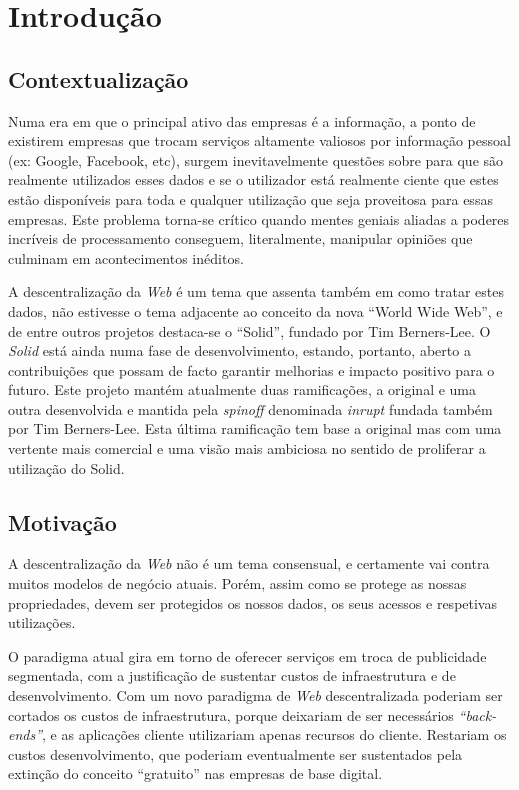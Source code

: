 \chapter{Introdução}
\label{cap:1}

\section{Contextualização}
Numa era em que o principal ativo das empresas é a informação, a ponto de existirem empresas que trocam serviços altamente valiosos por informação pessoal (ex: Google, Facebook, etc)\cite{top_three_issues_centralized_web}, surgem inevitavelmente questões sobre para que são realmente utilizados esses dados e se o utilizador está realmente ciente que estes estão disponíveis para toda e qualquer utilização que seja proveitosa para essas empresas\cite{facebook_data_hell_medium}. Este problema torna-se crítico quando mentes geniais aliadas a poderes incríveis de processamento conseguem, literalmente, manipular opiniões que culminam em acontecimentos inéditos\cite{cambridge_analytica}.

A descentralização da \emph{Web} é um tema que assenta também em como tratar estes dados, não estivesse o tema adjacente ao conceito da nova “World Wide Web”, e de entre outros projetos destaca-se o “Solid”, fundado por Tim Berners-Lee. O \emph{Solid} está ainda numa fase de desenvolvimento, estando, portanto, aberto a contribuições que possam de facto garantir melhorias e impacto positivo para o futuro\cite{why_web_decentralization_future}. Este projeto mantém atualmente duas ramificações, a original e uma outra desenvolvida e mantida pela \emph{spinoff} denominada \emph{inrupt} fundada também por Tim Berners-Lee. Esta última ramificação tem base a original mas com uma vertente mais comercial e uma visão mais ambiciosa no sentido de proliferar a utilização do Solid.

\section{Motivação}
A descentralização da \emph{Web} não é um tema consensual, e certamente vai contra muitos modelos de negócio atuais. Porém, assim como se protege as nossas propriedades, devem ser protegidos os nossos dados, os seus acessos e respetivas utilizações.

O paradigma atual gira em torno de oferecer serviços em troca de publicidade segmentada, com a justificação de sustentar custos de infraestrutura e de desenvolvimento\cite{top_three_issues_centralized_web}. Com um novo paradigma de \emph{Web} descentralizada poderiam ser cortados os custos de infraestrutura, porque deixariam de ser necessários \emph{“back-ends”}, e as aplicações cliente utilizariam apenas recursos do cliente. Restariam os custos desenvolvimento, que poderiam eventualmente ser sustentados pela extinção do conceito “gratuito” nas empresas de base digital\cite{why_web_decentralization_future}.

